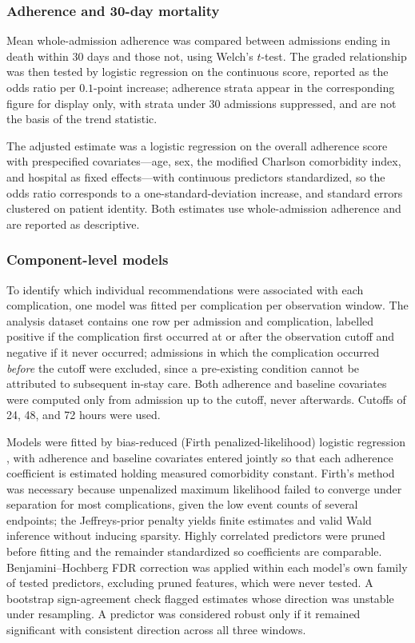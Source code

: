 \subsubsection{Adherence and 30-day mortality}

Mean whole-admission adherence was compared between admissions ending in
death within 30 days and those not, using Welch's $t$-test. The graded
relationship was then tested by logistic regression on the continuous score,
reported as the odds ratio per $0.1$-point increase; adherence strata appear
in the corresponding figure for display only, with strata under 30
admissions suppressed, and are not the basis of the trend statistic.

The adjusted estimate was a logistic regression on the overall adherence
score with prespecified covariates---age, sex, the modified Charlson
comorbidity index, and hospital as fixed effects---with continuous
predictors standardized, so the odds ratio corresponds to a
one-standard-deviation increase, and standard errors clustered on patient
identity. Both estimates use whole-admission adherence and are reported as
descriptive.

\subsubsection{Component-level models}

To identify which individual recommendations were associated with each
complication, one model was fitted per complication per observation window.
The analysis dataset contains one row per admission and complication,
labelled positive if the complication first occurred at or after the
observation cutoff and negative if it never occurred; admissions in which
the complication occurred \emph{before} the cutoff were excluded, since a
pre-existing condition cannot be attributed to subsequent in-stay care. Both
adherence and baseline covariates were computed only from admission up to
the cutoff, never afterwards. Cutoffs of 24, 48, and 72 hours were used.

Models were fitted by bias-reduced (Firth penalized-likelihood) logistic
regression \citep{firth1993bias}, with adherence and baseline covariates
entered jointly so that each adherence coefficient is estimated holding
measured comorbidity constant. Firth's method was necessary because
unpenalized maximum likelihood failed to converge under separation for most
complications, given the low event counts of several endpoints; the
Jeffreys-prior penalty yields finite estimates and valid Wald inference
without inducing sparsity. Highly correlated predictors were pruned before
fitting and the remainder standardized so coefficients are comparable.
Benjamini--Hochberg FDR correction was applied within each model's own family
of tested predictors, excluding pruned features, which were never tested. A
bootstrap sign-agreement check flagged estimates whose direction was unstable
under resampling. A predictor was considered robust only if it remained
significant with consistent direction across all three windows.

